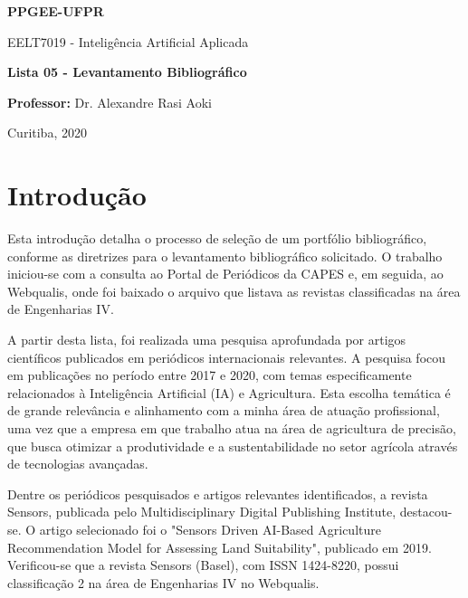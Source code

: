 \documentclass[a4paper,12pt]{article}
\begin{document}
\begin{titlepage}
    \centering
    {\normalsize \textbf{PPGEE-UFPR}\par}
    \vspace{0.1cm}
    {\normalsize EELT7019 - Inteligência Artificial Aplicada\par}
    \vspace{9cm}
    {\normalsize  \textbf{Lista 05 - Levantamento Bibliográfico}\par}
    \vspace{9cm}
    {\normalsize  \textbf{Professor:} Dr. Alexandre Rasi Aoki\par}
    \vspace{1cm}
    {\normalsize  Curitiba, 2020\par}
\end{titlepage}

\clearpage
\section{Introdução}
\begin{spacing}{1.5}

Esta introdução detalha o processo de seleção de um portfólio bibliográfico, conforme as diretrizes para o levantamento bibliográfico solicitado. O trabalho iniciou-se com a consulta ao Portal de Periódicos da CAPES e, em seguida, ao Webqualis, onde foi baixado o arquivo que listava as revistas classificadas na área de Engenharias IV.

A partir desta lista, foi realizada uma pesquisa aprofundada por artigos científicos publicados em periódicos internacionais relevantes. A pesquisa focou em publicações no período entre 2017 e 2020, com temas especificamente relacionados à Inteligência Artificial (IA) e Agricultura. Esta escolha temática é de grande relevância e alinhamento com a minha área de atuação profissional, uma vez que a empresa em que trabalho atua na área de agricultura de precisão, que busca otimizar a produtividade e a sustentabilidade no setor agrícola através de tecnologias avançadas.

Dentre os periódicos pesquisados e artigos relevantes identificados, a revista Sensors, publicada pelo Multidisciplinary Digital Publishing Institute, destacou-se. O artigo selecionado foi o "Sensors Driven AI-Based Agriculture Recommendation Model for Assessing Land Suitability", publicado em 2019. Verificou-se que a revista Sensors (Basel), com ISSN 1424-8220, possui classificação 2 na área de Engenharias IV no Webqualis.
\end{spacing}
\end{document}
